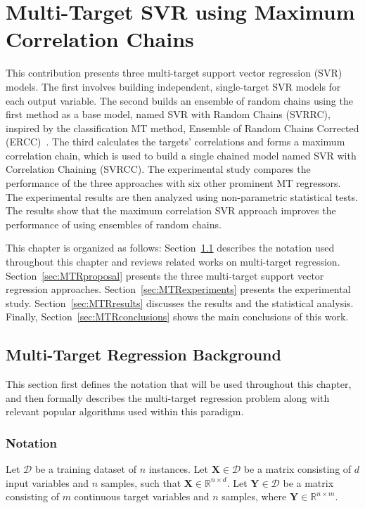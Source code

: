 \documentclass[reqno]{vcuthesis}
\numberwithin{equation}{chapter}
\begin{document}
\chapter{Multi-Target SVR using Maximum Correlation Chains}
This contribution presents three multi-target support vector regression (SVR) models. The first involves building independent, single-target SVR models for each output variable. The second builds an ensemble of random chains using the first method as a base model, named SVR with Random Chains (SVRRC), inspired by the classification MT method, Ensemble of Random Chains Corrected (ERCC)~\cite{Spyromitros2014}. The third calculates the targets' correlations and forms a maximum correlation chain, which is used to build a single chained model named SVR with Correlation Chaining (SVRCC). The experimental study compares the performance of the three approaches with six other prominent MT regressors. The experimental results are then analyzed using non-parametric statistical tests. The results show that the maximum correlation SVR approach improves the performance of using ensembles of random chains. 

This chapter is organized as follows: Section~\ref{sec:MTRbackground} describes the notation used throughout this chapter and reviews related works on multi-target regression. Section~\ref{sec:MTRproposal} presents the three multi-target support vector regression approaches. Section~\ref{sec:MTRexperiments} presents the experimental study. Section~\ref{sec:MTRresults} discusses the results and the statistical analysis. Finally, Section~\ref{sec:MTRconclusions} shows the main conclusions of this work.

\section{Multi-Target Regression Background}\label{sec:MTRbackground}
This section first defines the notation that will be used throughout this chapter, and then formally describes the multi-target regression problem along with relevant popular algorithms used within this paradigm.

\subsection{Notation}\label{subsec:mtrnotation}
Let $\mathcal{D}$ be a training dataset of $n$ instances. Let $\bm{X} \in \mathcal{D}$ be a matrix consisting of $d$ input variables and $n$ samples, such that $\bm{X} \in \mathbb{R}^{n \times d}$. Let $\bm{Y} \in \mathcal{D}$ be a matrix consisting of $m$ continuous target variables and $n$ samples,  where $\bm{Y} \in \mathbb{R}^{n \times m}$. 
\end{document}
